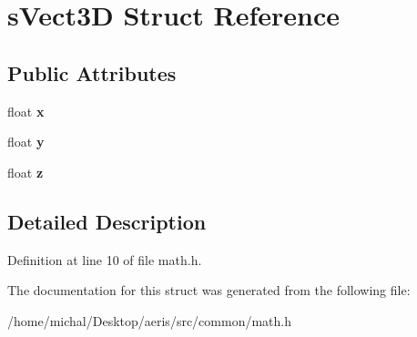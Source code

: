 \hypertarget{structsVect3D}{\section{s\-Vect3\-D Struct Reference}
\label{structsVect3D}
}
\subsection*{Public Attributes}
\begin{DoxyCompactItemize}
\item 
\hypertarget{structsVect3D_a23b2575c1306f5030047684cb32e69f1}{float {\bfseries x}}\label{structsVect3D_a23b2575c1306f5030047684cb32e69f1}

\item 
\hypertarget{structsVect3D_a06685dd96cf77950ab98e19bc7760e96}{float {\bfseries y}}\label{structsVect3D_a06685dd96cf77950ab98e19bc7760e96}

\item 
\hypertarget{structsVect3D_a66ee454bab8eb16c0b521feea05fc51b}{float {\bfseries z}}\label{structsVect3D_a66ee454bab8eb16c0b521feea05fc51b}

\end{DoxyCompactItemize}


\subsection{Detailed Description}


Definition at line 10 of file math.\-h.



The documentation for this struct was generated from the following file\-:\begin{DoxyCompactItemize}
\item 
/home/michal/\-Desktop/aeris/src/common/math.\-h\end{DoxyCompactItemize}
